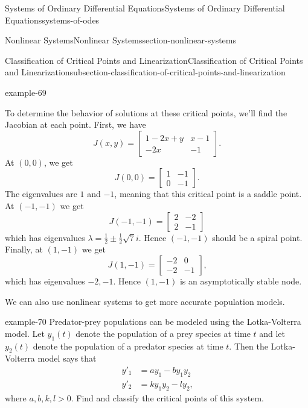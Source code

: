 \documentclass[oneside,10pt,]{book}
\numberwithin{equation}{section}
\newcommand{\amp}{&}
\begin{document}
\begin{chapterptx}{Systems of Ordinary Differential Equations}{}{Systems of Ordinary Differential Equations}{}{}{systems-of-odes}
\begin{sectionptx}{Nonlinear Systems}{}{Nonlinear Systems}{}{}{section-nonlinear-systems}
\begin{subsectionptx}{Classification of Critical Points and Linearization}{}{Classification of Critical Points and Linearization}{}{}{subsection-classification-of-critical-points-and-linearization}
\begin{example}{}{example-69}
\par
\hypertarget{p-416}{}%
To determine the behavior of solutions at these critical points, we'll find the Jacobian at each point. First, we have%
\begin{equation*}
J(x,y) = \begin{bmatrix} 1 - 2x + y \amp x - 1 \\ -2x \amp -1\end{bmatrix}\text{.}
\end{equation*}
At \((0,0)\), we get%
\begin{equation*}
J(0,0) = \begin{bmatrix} 1 \amp -1 \\ 0 \amp -1\end{bmatrix}\text{.}
\end{equation*}
The eigenvalues are \(1\) and \(-1\), meaning that this critical point is a saddle point. At \((-1,-1)\) we get%
\begin{equation*}
J(-1,-1) = \begin{bmatrix}2 \amp -2 \\ 2 \amp -1\end{bmatrix}
\end{equation*}
which has eigenvalues \(\lambda = \frac{1}{2}\pm\frac{1}{2}\sqrt{7}i\). Hence \((-1,-1)\) should be a spiral point. Finally, at \((1,-1)\) we get%
\begin{equation*}
J(1,-1) = \begin{bmatrix} -2 \amp 0 \\ -2 \amp -1\end{bmatrix}\text{,}
\end{equation*}
which has eigenvalues \(-2,-1\). Hence \((1,-1)\) is an asymptotically stable node.%
\end{example}
\hypertarget{p-417}{}%
We can also use nonlinear systems to get more accurate population models.%
\begin{example}{}{example-70}%
\hypertarget{p-418}{}%
Predator-prey populations can be modeled using the Lotka-Volterra model. Let \(y_{1}(t)\) denote the population of a prey species at time \(t\) and let \(y_{2}(t)\) denote the population of a predator species at time \(t\). Then the Lotka-Volterra model says that%
\begin{align*}
y'_{1} \amp = ay_{1}-by_{1}y_{2}\\
y'_{2} \amp = ky_{1}y_{2} - ly_{2}\text{,}
\end{align*}
where \(a,b,k,l>0\). Find and classify the critical points of this system.%
\par\smallskip%

\end{example}
\end{subsectionptx}
\end{sectionptx}
\end{chapterptx}
\end{document}
